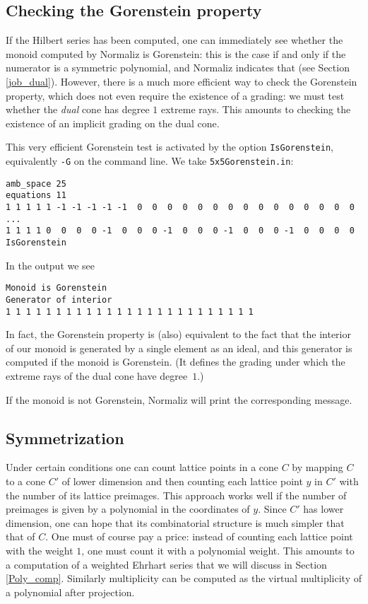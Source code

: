 \documentclass[12pt,a4paper]{scrartcl}
\theoremstyle{definition}
\def\ttt{\texttt}
\begin{document}
{\subsection{Checking  the Gorenstein property}\label{Gorenstein}

If the Hilbert series has been computed, one can immediately see whether the monoid computed by Normaliz is Gorenstein: this is the case if and only if the numerator is a symmetric polynomial, and Normaliz indicates that (see Section \ref{job_dual}). However, there is a much more efficient way to check the Gorenstein property, which does not even require the existence of a grading: we must test whether the \emph{dual} cone has degree $1$ extreme rays. This amounts to checking the existence of an implicit grading on the dual cone.

This very efficient Gorenstein test is activated by the option \ttt{IsGorenstein}, equivalently \ttt{-G} on the command line. We take \verb|5x5Gorenstein.in|:

\begin{Verbatim}
amb_space 25
equations 11
1 1 1 1 1 -1 -1 -1 -1 -1  0  0  0  0  0  0  0  0  0  0  0  0  0  0  0
...
1 1 1 1 0  0  0  0 -1  0  0  0 -1  0  0  0 -1  0  0  0 -1  0  0  0  0
IsGorenstein
\end{Verbatim}

In the output we see
\begin{Verbatim}
Monoid is Gorenstein 
Generator of interior
1 1 1 1 1 1 1 1 1 1 1 1 1 1 1 1 1 1 1 1 1 1 1 1 1 
\end{Verbatim}

In fact, the Gorenstein property is (also) equivalent to the fact that the interior of our monoid is generated by a single element as an ideal, and this generator is computed if the monoid is Gorenstein. (It defines the grading under which the extreme rays of the dual cone have degree~$1$.)

If the monoid is not Gorenstein, Normaliz will print the corresponding message.

\subsection{Symmetrization}\label{symmetrize}

Under certain conditions one can count lattice points in a cone $C$  by mapping $C$ to a cone $C'$ of lower dimension and then counting each lattice point $y$ in $C'$ with the number of its lattice preimages. This approach works well if the number of preimages is given by a polynomial in the coordinates of $y$. Since $C'$ has lower dimension, one can hope that its combinatorial structure is much simpler that that of $C$. One must of course pay a price: instead of counting each lattice point with the weight $1$, one must count it with a polynomial weight. This amounts to a computation of a weighted Ehrhart series that we will discuss in Section \ref{Poly_comp}. Similarly multiplicity can be computed as the virtual multiplicity of a polynomial after projection.

}
\end{document}
